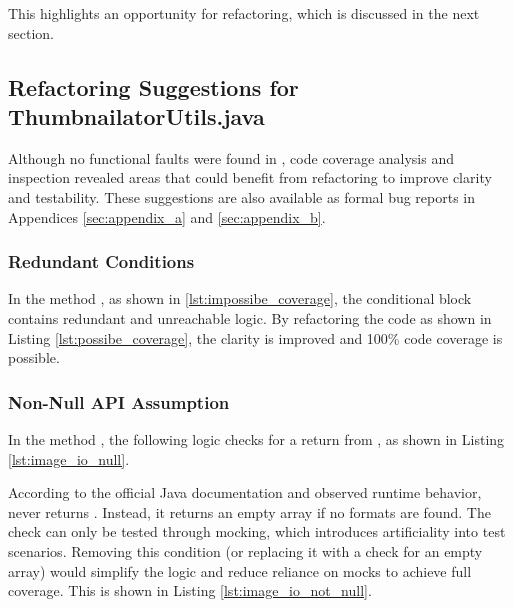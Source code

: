\documentclass[12pt]{article}
\begin{document}
    This highlights an opportunity for refactoring, which is discussed in the
        next section.

    \markboth{}{}
    \subsection{Refactoring Suggestions for ThumbnailatorUtils.java}
    \markboth{}{}

    Although no functional faults were found in ,
        code coverage analysis and inspection revealed areas that could benefit
        from refactoring to improve clarity and testability.
    These suggestions are also available as formal bug reports in Appendices
        \ref{sec:appendix_a} and \ref{sec:appendix_b}.

    \subsubsection{Redundant Conditions}

    In the method
        , as shown
        in \ref{lst:impossibe_coverage}, the conditional block contains
        redundant and unreachable logic.
    By refactoring the code as shown in Listing \ref{lst:possibe_coverage}, the
        clarity is improved and 100\% code coverage is possible.

    

    \subsubsection{Non-Null API Assumption}

    In the method , the following logic checks
        for a  return from , as
        shown in Listing \ref{lst:image_io_null}.

    

    According to the official Java documentation and observed runtime
        behavior,\\
         never returns .
    Instead, it returns an empty array if no formats are found.
    The  check can only be tested through mocking, which introduces
        artificiality into test scenarios.
    Removing this condition (or replacing it with a check for an empty array)
        would simplify the logic and reduce reliance on mocks to achieve full
        coverage.
    This is shown in Listing \ref{lst:image_io_not_null}.
\end{document}
